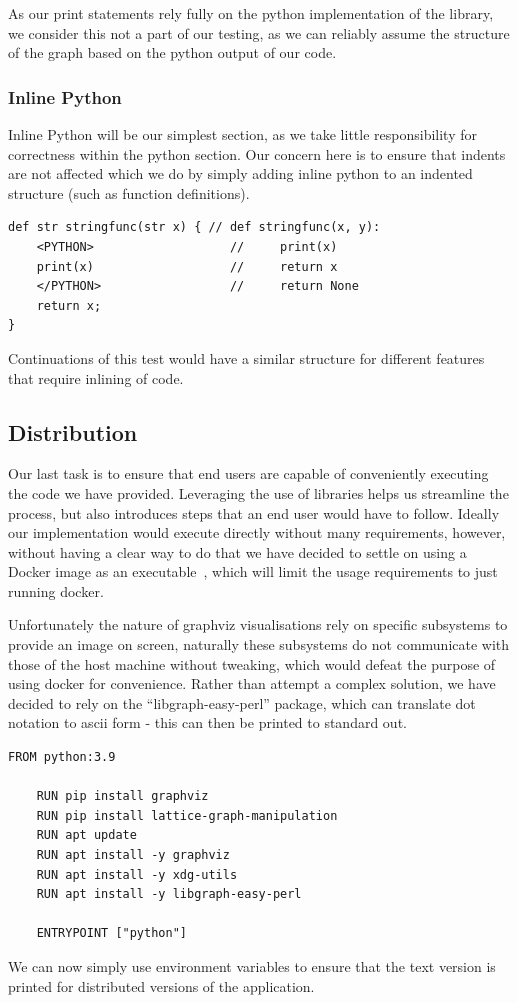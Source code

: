 As our print statements rely fully on the python implementation of the library, we consider this not a part of our
testing, as we can reliably assume the structure of the graph based on the python output of our code.

\subsubsection{Inline Python}
Inline Python will be our simplest section, as we take little responsibility for correctness within the python section.
Our concern here is to ensure that indents are not affected which we do by simply adding inline python to an indented
structure (such as function definitions).

\begin{lstlisting}[caption={Testing that injections maintain indents},captionpos=b, label={lst:python-indentation-test}]
def str stringfunc(str x) { // def stringfunc(x, y):
    <PYTHON>                   //     print(x)
    print(x)                   //     return x
    </PYTHON>                  //     return None
    return x;
}
\end{lstlisting}

Continuations of this test would have a similar structure for different features that require inlining of code.

\subsection{Distribution}
Our last task is to ensure that end users are capable of conveniently executing the code we have provided.
Leveraging the use of libraries helps us streamline the process, but also introduces steps that an end user would have
to follow.
Ideally our implementation would execute directly without many requirements, however, without having a clear way to do
that we have decided to settle on using a Docker image as an executable~\cite{DockerExec}, which will limit the usage
requirements to just running docker.

Unfortunately the nature of graphviz visualisations rely on specific subsystems to provide an image on screen, naturally
these subsystems do not communicate with those of the host machine without tweaking, which would defeat the purpose of
using docker for convenience.
Rather than attempt a complex solution, we have decided to rely on the ``libgraph-easy-perl'' package, which can
translate dot notation to ascii form - this can then be printed to standard out.

\begin{lstlisting}[caption={The DockerFile used for distribution},captionpos=b,label={lst:dockerfile}]
    FROM python:3.9

    RUN pip install graphviz
    RUN pip install lattice-graph-manipulation
    RUN apt update
    RUN apt install -y graphviz
    RUN apt install -y xdg-utils
    RUN apt install -y libgraph-easy-perl

    ENTRYPOINT ["python"]
\end{lstlisting}

We can now simply use environment variables to ensure that the text version is printed for distributed versions of
the application.

